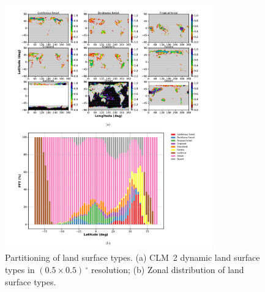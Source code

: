 \documentclass[gmd, manuscript]{copernicus}
\providecommand{\DIFaddbeginFL}{} %
\providecommand{\DIFaddendFL}{} %
\providecommand{\DIFdelbeginFL}{} %
\providecommand{\DIFdelendFL}{} %
\begin{document}
\appendixfigures
\begin{figure}[!htbp]
  \centering
  \DIFdelbeginFL %
\DIFdelendFL \DIFaddbeginFL \includegraphics[width=0.8\textwidth]{fig11}
  \DIFaddendFL \caption{Partitioning of land surface types. (a) CLM~2 dynamic land surface types in $(0.5\times0.5)\,\unit{^\circ}$ resolution; (b) Zonal distribution of land surface types.}
  \label{fig:pft_landsurface}
\end{figure}



\noappendix       %



\end{document}
